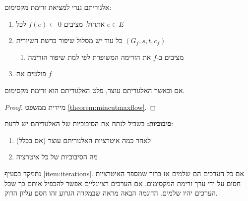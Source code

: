 אלגוריתם גנרי למציאת זרימת מקסימום:

\begin{enumerate}
\item
אתחול: מציבים 
$f(e) \leftarrow 0$
לכל
$e \in E$

\item
כל עוד יש מסלול שיפור ברשת השיורית
$(G_f, s, t, c_f)$
\begin{enumerate}
\item
מציבים ב-$f$ את הזרימה המשופרת לפי למת שיפור הזרימה
\end{enumerate}
\item
פולטים את $f$
\end{enumerate}

\begin{claim}
אם וכאשר האלגוריתם עוצר, פלט האלגוריתם הוא זרימת מקסימום.
\end{claim}

\begin{proof}
מיידית ממשפט
\ref{theorem:mincutmaxflow}.
\end{proof}

\textbf{סיבוכיות:}
בשביל לנתח את הסיבוכיות של האלגוריתם יש לדעת:
\begin{enumerate}
\item
\label{item:iterations}
לאחר כמה איטרציות האלגוריתם עוצר (אם בכלל)
\item
מה הסיבוכיות של כל איטרציה
\end{enumerate}

נתמקד בסעיף
\ref{item:iterations}.
אם כל הערכים הם שלמים אז ברור שמספר האיטרציות חסום על ידי ערך זרימת המקסימום. 
אם הערכים רציונליים אפשר להכפיל אותם כך שכל הערכים יהיו שלמים.
הדוגמה הבאה מראה שבמקרה הגרוע זהו חסם עליון הדוק.

